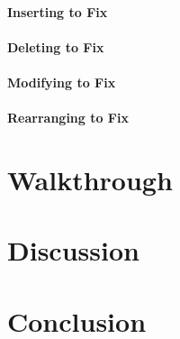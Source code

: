 \paragraph{Inserting to Fix}
\paragraph{Deleting to Fix}
\paragraph{Modifying to Fix}
\paragraph{Rearranging to Fix}

\section{Walkthrough}


\section{Discussion}


\section{Conclusion}
